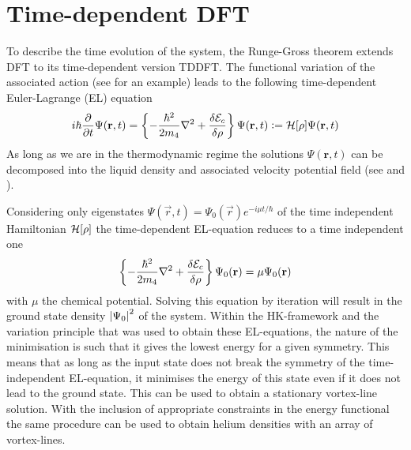 	\section{Time-dependent DFT}\label{sec:tddft}
		To describe the time evolution of the system, the Runge-Gross theorem extends DFT to its time-dependent version TDDFT\citep{Run84}. The functional variation of the associated action (see  for an example) leads to the following time-dependent Euler-Lagrange (EL) equation 
	\begin{align}
		i\hbar\frac{\partial}{\partial t} \Psi(\vec{r},t) = \left\{-\frac{\hbar^2}{2m_4}\laplacian + \fdv{\mathcal{E}_c}{\rho}\right\}\Psi(\vec{r},t) \vcentcolon= \mathcal{H}\qty[\rho]\Psi(\vec{r},t) 
		\label{eq:td-el-equation}
	\end{align}
	As long as we are in the thermodynamic regime the solutions $\Psi(\textbf{r},t)$ can be decomposed into the liquid density and associated velocity potential field (see  and ).
	
	Considering only eigenstates $\Psi(\vec{r},t)=\Psi_0(\vec{r})\unit{e}^{-i\mu t/\hbar}$ of the time independent Hamiltonian $\mathcal{H}\qty[\rho]$ the time-dependent EL-equation reduces to a time independent one
	\begin{align}
		\left\{-\frac{\hbar^2}{2m_4} \laplacian + \fdv{\mathcal{E}_c}{\rho}\right\}\Psi_0(\textbf{r}) = \mu\Psi_0(\textbf{r})
		\label{eq:el-equation}
	\end{align}
	with $\mu$ the chemical potential. Solving this equation by iteration will result in the ground state density $\abs{\Psi_0}^2$ of the system. Within the HK-framework and the variation principle that was used to obtain these EL-equations, the nature of the minimisation is such that it gives the lowest energy for a given symmetry. This means that as long as the input state does not break the symmetry of the time-independent EL-equation, it minimises the energy of this state even if it does not lead to the ground state. This can be used to obtain a stationary vortex-line solution. With the inclusion of appropriate constraints in the energy functional the same procedure can be used to obtain helium densities with an array of vortex-lines.

